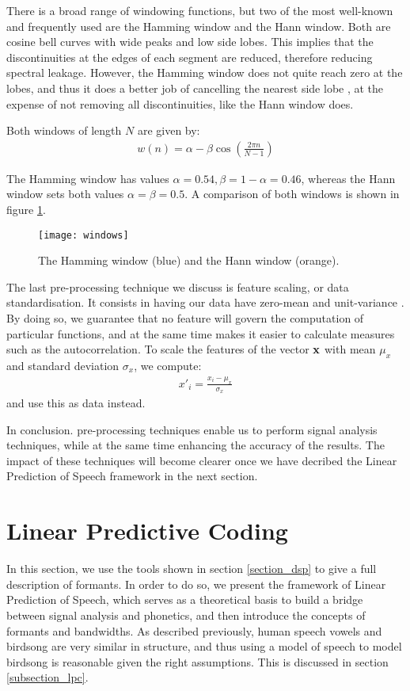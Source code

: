 \documentclass[../main.tex]{subfiles}
\begin{document}
\par There is a broad range of windowing functions, but two of the most well-known and frequently used are the Hamming window and the Hann window. Both are cosine bell curves with wide peaks and low side lobes. This implies that the discontinuities at the edges of each segment are reduced, therefore reducing spectral leakage. However, the Hamming window does not quite reach zero at the lobes, and thus it does a better job of cancelling the nearest side lobe \cite{NationalInstruments2015}, at the expense of not removing all discontinuities, like the Hann window does.
\par Both windows of length $N$ are given by:
\begin{align*}
w(n) = \alpha - \beta \cos{\left(\frac{2\pi n}{N-1}\right)}
\end{align*}
\par The Hamming window has values $\alpha = 0.54, \beta = 1 - \alpha = 0.46$, whereas the Hann window sets both values $\alpha = \beta = 0.5$. A comparison of both windows is shown in figure \ref{fig_windows}.
\begin{figure}[t]
\centering
\texttt{[image: windows]}
\caption{The Hamming window (blue) and the Hann window (orange).}
\label{fig_windows}
\end{figure}
\par The last pre-processing technique we discuss is feature scaling, or data standardisation. It consists in having our data have zero-mean and unit-variance \cite{Raschka2014}. By doing so, we guarantee that no feature will govern the computation of particular functions, and at the same time makes it easier to calculate measures such as the autocorrelation. To scale the features of the vector $\mathbf{x}$ with mean $\mu_x$ and standard deviation $\sigma_x$, we compute:
\begin{align*}
x'_i = \frac{x_i - \mu_x}{\sigma_x}
\end{align*}
and use this as data instead.
\par In conclusion. pre-processing techniques enable us to perform signal analysis techniques, while at the same time enhancing the accuracy of the results. The impact of these techniques will become clearer once we have decribed the Linear Prediction of Speech framework in the next section.

\section{Linear Predictive Coding} \label{section_lpc}
In this section, we use the tools shown in section \ref{section_dsp} to give a full description of formants. In order to do so, we present the framework of Linear Prediction of Speech, which serves as a theoretical basis to build a bridge between signal analysis and phonetics, and then introduce the concepts of formants and bandwidths. As described previously, human speech vowels and birdsong are very similar in structure, and thus using a model of speech to model birdsong is reasonable given the right assumptions. This is discussed in section \ref{subsection_lpc}.
\end{document}
